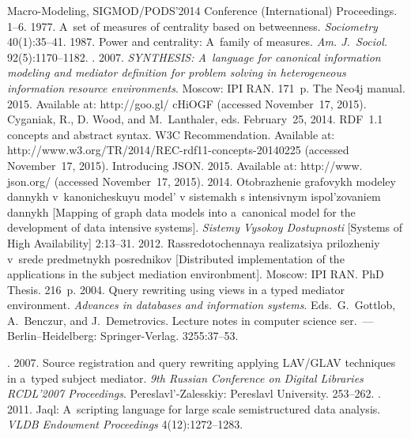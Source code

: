 \begin{multicols}{2}
{{\begin{thebibliography}{99}
{Macro-Modeling, SIGMOD/PODS'2014 Conference (International) Proceedings}. 1--6.
 1977. A~set of measures of centrality based on betweenness. 
\textit{Sociometry} 40(1):35--41.
 1987. Power and centrality: A~family of measures. \textit{Am. 
J.~Sociol.} 92(5):1170--1182.
. 2007. \textit{SYNTHESIS: 
A~language for canonical information modeling and mediator definition for problem solving in 
heterogeneous information resource environments}. Moscow: IPI RAN. 171~p.
The Neo4j manual. 2015. Available at: {\sf http://goo.gl/ cHiOGF} (accessed November~17, 2015).
Cyganiak, R., D. Wood, and M.~Lanthaler, eds. 
February~25, 2014.
RDF~1.1 concepts and abstract syntax. 
W3C Recommendation.  Available at: {\sf  
http://www.\linebreak w3.org/TR/2014/REC-rdf11-concepts-20140225} (accessed November~17, 2015).
Introducing JSON. 2015. Available at: {\sf http://www. json.org/} (accessed November~17, 2015).
 2014. Otobrazhenie grafovykh modeley dannykh v~kanonicheskuyu 
model' v sistemakh s intensivnym ispol'zovaniem dannykh [Mapping of graph data models into 
a~canonical model for the development of data intensive systems]. \textit{Sistemy Vysokoy 
Dostupnosti} [Systems of High Availability] 2:13--31.
 2012. Rassredotochennaya realizatsiya prilozheniy v~srede predmetnykh 
posrednikov [Distributed implementation of the applications in the subject mediation 
environbment].  Moscow: IPI RAN. PhD Thesis. 216~p.
 2004. 
Query rewriting using 
views in a typed mediator environment.  
\textit{Advances in databases and information systems}.
Eds.\ G.~Gottlob,  A.~Benczur, and J.~Demetrovics.
 Lecture notes in computer science ser.~---  
Berlin--Heidelberg: Springer-Verlag. 3255:37--53.

. 2007. Source registration and 
query rewriting applying LAV/GLAV techniques in a~typed subject mediator. \textit{9th Russian 
Conference on Digital Libraries RCDL'2007 Proceedings}. Pereslavl'-Zalesskiy:  
Pereslavl University. 253--262.
. 2011. Jaql: A~scripting language for large scale semistructured 
data analysis. \textit{VLDB Endowment Proceedings} 4(12):1272--1283.
\end{thebibliography}

 }
 }

\end{multicols}


